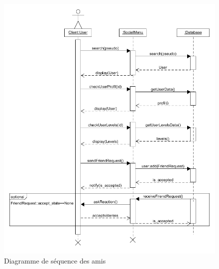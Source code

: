 \documentclass[french]{article}
\begin{document}
\begin{figure}[!htbp]%
    \centering
    \includegraphics[scale=0.5]{sequence_diagram/uml_sequence_online.png}
    \caption{Diagramme de séquence des amis}
    \label{sequence diagram:online menu}
\end{figure}
\end{document}
